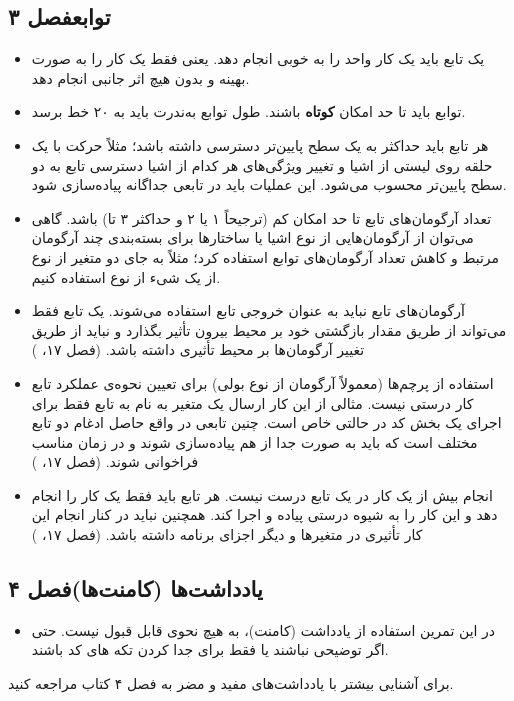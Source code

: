 \documentclass{utap}
\newcommand{\chap}[1]{\hfill\normalfont\normalsize فصل #1}
\begin{document}
\subsection[توابع]{توابع\chap{۳}}
  \begin{itemize}
    \item
یک تابع باید یک کار واحد را به خوبی انجام دهد. یعنی فقط یک کار را به صورت بهینه و بدون هیچ اثر جانبی انجام دهد.
    \item
توابع باید تا حد امکان \textbf{کوتاه} باشند.
طول توابع به‌ندرت باید به ۲۰ خط برسد.
    \item
هر تابع باید حداکثر به یک سطح پایین‌تر دسترسی داشته باشد؛ مثلاً حرکت با یک حلقه روی لیستی از اشیا و تغییر ویژگی‌های هر کدام از اشیا دسترسی تابع به دو سطح پایین‌تر محسوب می‌شود. این عملیات باید در تابعی جداگانه پیاده‌سازی شود.
    \item
تعداد آرگومان‌های تابع تا حد امکان کم (ترجیحاً ۱ یا ۲ و حداکثر ۳ تا) باشد.
گاهی می‌توان از آرگومان‌هایی از نوع اشیا یا ساختارها برای بسته‌بندی چند آرگومان مرتبط و کاهش تعداد آرگومان‌های توابع استفاده کرد؛ مثلاً به جای دو متغیر از نوع  از یک شیء از نوع  استفاده کنیم.
    \item
آرگومان‌های تابع نباید به عنوان خروجی تابع استفاده می‌شوند.
یک تابع فقط می‌تواند از طریق مقدار بازگشتی خود بر محیط بیرون تأثیر بگذارد و نباید از طریق تغییر آرگومان‌ها بر محیط تأثیری داشته باشد. (فصل ۱۷، )
    \item
استفاده از پرچم‌ها (معمولاً آرگومان از نوع بولی) برای تعیین نحوه‌ی عملکرد تابع کار درستی نیست.
مثالی از این کار ارسال یک متغیر به نام  به تابع فقط برای اجرای یک بخش کد در حالتی خاص است. چنین تابعی در واقع حاصل ادغام دو تابع مختلف است که باید به صورت جدا از هم پیاده‌سازی شوند و در زمان مناسب فراخوانی شوند. (فصل ۱۷، )
    \item
انجام بیش از یک کار در یک تابع درست نیست. هر تابع باید فقط یک کار را انجام دهد و این کار را به شیوه درستی پیاده و اجرا کند. همچنین نباید در کنار انجام این کار تأثیری در متغیرها و دیگر اجزای برنامه داشته باشد. (فصل ۱۷، )
    \end{itemize}

\subsection[یادداشت‌ها]{یادداشت‌ها (کامنت‌ها)\chap{۴}}
      \begin{itemize}
            \item
در این تمرین استفاده از یادداشت (کامنت)، به هیچ نحوی قابل قبول نیست. حتی اگر توضیحی نباشند یا فقط برای جدا کردن تکه های کد باشند.
        \end{itemize}
برای آشنایی بیشتر با یادداشت‌های مفید و مضر به فصل ۴ کتاب مراجعه کنید.
\end{document}
